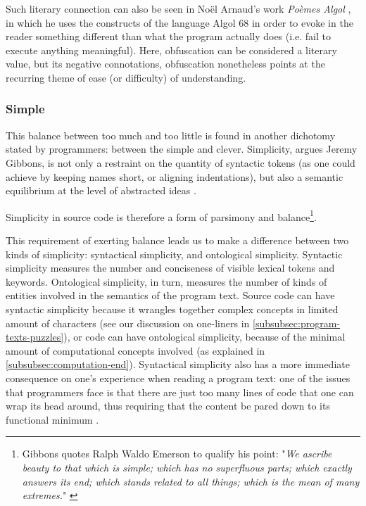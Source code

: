 Such literary connection can also be seen in Noël Arnaud's work \emph{Poèmes Algol} \citep{arnaud_poemes_1968}, in which he uses the constructs of the language Algol 68 in order to evoke in the reader something different than what the program actually does (i.e. fail to execute anything meaningful). Here, obfuscation can be considered a literary value, but its negative connotations, obfuscation nonetheless points at the recurring theme of ease (or difficulty) of understanding.

\subsubsection{Simple}
\label{subsubsec:simple}

This balance between too much and too little is found in another dichotomy stated by programmers: between the simple and clever. Simplicity, argues Jeremy Gibbons, is not only a restraint on the quantity of syntactic tokens (as one could achieve by keeping names short, or aligning indentations), but also a semantic equilibrium at the level of abstracted ideas \citep{gibbons_beauty_2012}.

Simplicity in source code is therefore a form of parsimony and balance\footnote{Gibbons quotes Ralph Waldo Emerson to qualify his point: "\emph{We ascribe beauty to that which is simple; which has no superfluous parts; which exactly answers its end; which stands related to all things; which is the mean of many extremes.}" \citep{gibbons_beauty_2012}}.

This requirement of exerting balance  leads us to make a difference between two kinds of simplicity: syntactical simplicity, and ontological simplicity. Syntactic simplicity measures the number and conciseness of visible lexical tokens and keywords. Ontological simplicity, in turn, measures the number of kinds of entities involved in the semantics of the program text. Source code can have syntactic simplicity because it wrangles together complex concepts in limited amount of characters (see our discussion on one-liners in \autoref{subsubsec:program-texts-puzzles}), or code can have ontological simplicity, because of the minimal amount of computational concepts involved (as explained in \autoref{subsubsec:computation-end}). Syntactical simplicity also has a more immediate consequence on one's experience when reading a program text: one of the issues that programmers face is that there are just too many lines of code that one can wrap its head around, thus requiring that the content be pared down to its functional minimum \citep{butler_programmer_2012}.

